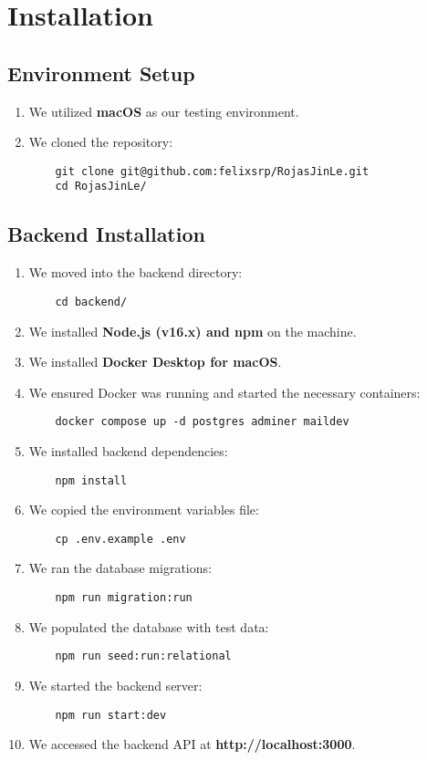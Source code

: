 \chapter{Installation}

\section{Environment Setup}
\begin{enumerate}
    \item We utilized \textbf{macOS} as our testing environment.
    \item We cloned the repository:
    \begin{verbatim}
    git clone git@github.com:felixsrp/RojasJinLe.git
    cd RojasJinLe/
    \end{verbatim}
\end{enumerate}

\section{Backend Installation}
\begin{enumerate}
    \item We moved into the backend directory:
    \begin{verbatim}
    cd backend/
    \end{verbatim}
    \item We installed \textbf{Node.js (v16.x) and npm} on the machine.
    \item We installed \textbf{Docker Desktop for macOS}.
    \item We ensured Docker was running and started the necessary containers:
    \begin{verbatim}
    docker compose up -d postgres adminer maildev
    \end{verbatim}
    \item We installed backend dependencies:
    \begin{verbatim}
    npm install
    \end{verbatim}
    \item We copied the environment variables file:
    \begin{verbatim}
    cp .env.example .env
    \end{verbatim}
    \item We ran the database migrations:
    \begin{verbatim}
    npm run migration:run
    \end{verbatim}
    \item We populated the database with test data:
    \begin{verbatim}
    npm run seed:run:relational
    \end{verbatim}
    \item We started the backend server:
    \begin{verbatim}
    npm run start:dev
    \end{verbatim}
    \item We accessed the backend API at \textbf{http://localhost:3000}.
\end{enumerate}


